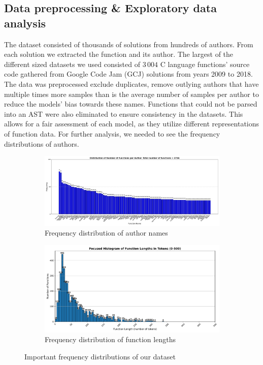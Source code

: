 \documentclass{article}
\begin{document}
\subsection{Data preprocessing \& Exploratory data analysis}
The dataset consisted of thousands of solutions from hundreds of authors. From each solution we extracted the function and its author.
The largest of the different sized datasets we used consisted of $3\,004$ C language functions' source code gathered from Google Code Jam (GCJ) solutions from years 2009 to 2018. The data was preprocessed exclude duplicates, 
remove outlying authors that have multiple times more samples than is the average number of samples per author to reduce the models' bias towards these names. Functions 
that could not be parsed into an AST were also eliminated to ensure consistency in the datasets. This allows for a fair assessment of each model, 
as they utilize different representations of function data. For further analysis, we needed to see the frequency distributions of authors. 


\begin{figure}[h]
    \centering
    \begin{subfigure}{0.48\textwidth} %
        \centering
        \includegraphics[width=\linewidth]{figures/distribution_names.pdf}
        \caption{Frequency distribution of author names}
        \label{fig:distr_names}
    \end{subfigure}
    \hfill
    \begin{subfigure}{0.48\textwidth}
        \centering
        \includegraphics[width=\linewidth]{figures/distr_lens_tokens.pdf}
        \caption{Frequency distribution of function lengths}
        \label{fig:disrt_lens}
    \end{subfigure}
    \caption{Important frequency distributions of our dataset}
    \label{fig:eda_distr}
\end{figure}
\end{document}
